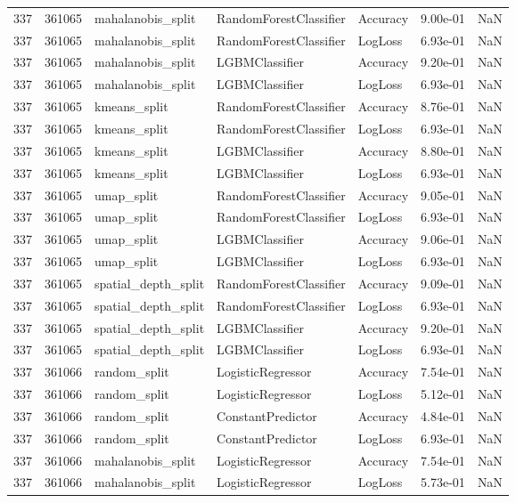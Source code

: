 \begin{tabular}{rrlllrr}
337 & 361065 & mahalanobis\_split & RandomForestClassifier & Accuracy & 9.00e-01 & NaN \\
337 & 361065 & mahalanobis\_split & RandomForestClassifier & LogLoss & 6.93e-01 & NaN \\
337 & 361065 & mahalanobis\_split & LGBMClassifier & Accuracy & 9.20e-01 & NaN \\
337 & 361065 & mahalanobis\_split & LGBMClassifier & LogLoss & 6.93e-01 & NaN \\
337 & 361065 & kmeans\_split & RandomForestClassifier & Accuracy & 8.76e-01 & NaN \\
337 & 361065 & kmeans\_split & RandomForestClassifier & LogLoss & 6.93e-01 & NaN \\
337 & 361065 & kmeans\_split & LGBMClassifier & Accuracy & 8.80e-01 & NaN \\
337 & 361065 & kmeans\_split & LGBMClassifier & LogLoss & 6.93e-01 & NaN \\
337 & 361065 & umap\_split & RandomForestClassifier & Accuracy & 9.05e-01 & NaN \\
337 & 361065 & umap\_split & RandomForestClassifier & LogLoss & 6.93e-01 & NaN \\
337 & 361065 & umap\_split & LGBMClassifier & Accuracy & 9.06e-01 & NaN \\
337 & 361065 & umap\_split & LGBMClassifier & LogLoss & 6.93e-01 & NaN \\
337 & 361065 & spatial\_depth\_split & RandomForestClassifier & Accuracy & 9.09e-01 & NaN \\
337 & 361065 & spatial\_depth\_split & RandomForestClassifier & LogLoss & 6.93e-01 & NaN \\
337 & 361065 & spatial\_depth\_split & LGBMClassifier & Accuracy & 9.20e-01 & NaN \\
337 & 361065 & spatial\_depth\_split & LGBMClassifier & LogLoss & 6.93e-01 & NaN \\
337 & 361066 & random\_split & LogisticRegressor & Accuracy & 7.54e-01 & NaN \\
337 & 361066 & random\_split & LogisticRegressor & LogLoss & 5.12e-01 & NaN \\
337 & 361066 & random\_split & ConstantPredictor & Accuracy & 4.84e-01 & NaN \\
337 & 361066 & random\_split & ConstantPredictor & LogLoss & 6.93e-01 & NaN \\
337 & 361066 & mahalanobis\_split & LogisticRegressor & Accuracy & 7.54e-01 & NaN \\
337 & 361066 & mahalanobis\_split & LogisticRegressor & LogLoss & 5.73e-01 & NaN \\

\end{tabular}
